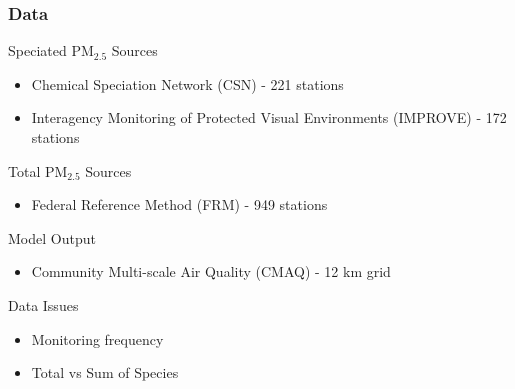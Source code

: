 \documentclass[t]{beamer}\usepackage[]{graphicx}\usepackage[]{color}
\newcommand{\PM}{$\text{PM}_{2.5}$ }
\begin{document}
\begin{frame}
\frametitle{Data}

Speciated \PM Sources
\begin{itemize}
  \item Chemical Speciation Network (CSN) - 221 stations
  \item Interagency Monitoring of Protected Visual Environments (IMPROVE) - 172 stations
\end{itemize}

\vspace{2mm}

Total \PM Sources
\begin{itemize}
  \item Federal Reference Method (FRM) - 949 stations
\end{itemize}

\vspace{2mm}

Model Output
\begin{itemize}
  \item Community Multi-scale Air Quality (CMAQ) - 12 km grid
\end{itemize}

\vspace{5mm}

Data Issues
\begin{itemize}
  \item Monitoring frequency
  \item Total vs Sum of Species
\end{itemize}

\end{frame}


\end{document}
